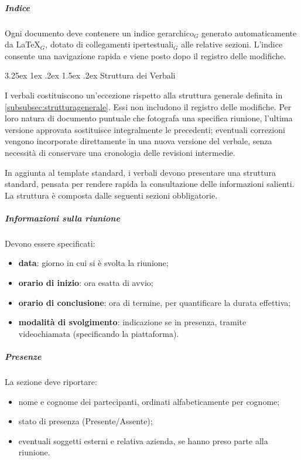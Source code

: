 \documentclass[a4paper, 10pt]{article}
\makeatletter
\renewcommand\paragraph{\@startsection{paragraph}{4}{\z@}%
  {3.25ex \@plus1ex \@minus .2ex}%
  {1.5ex \@plus .2ex}%
  {\normalfont\normalsize\bfseries}}
\makeatother
\begin{document}
\subparagraph{Indice}

Ogni documento deve contenere un indice gerarchico$_G$ generato automaticamente da \LaTeX$_G$, dotato di collegamenti ipertestuali$_G$ alle relative sezioni. L'indice consente una navigazione rapida e viene posto dopo il registro delle modifiche.

\paragraph{Struttura dei Verbali}
\label{par:strutturaverbali}

I verbali costituiscono un'eccezione rispetto alla struttura generale definita in \ref{subsubsec:strutturagenerale}. Essi non includono il registro delle modifiche. Per loro natura di documento puntuale che fotografa una specifica riunione, l'ultima versione approvata sostituisce integralmente le precedenti; eventuali correzioni vengono incorporate direttamente in una nuova versione del verbale, senza necessità di conservare una cronologia delle revisioni intermedie.

In aggiunta al template standard, i verbali devono presentare una struttura standard, pensata per rendere rapida la consultazione delle informazioni salienti. La struttura è composta dalle seguenti sezioni obbligatorie.

\subparagraph{Informazioni sulla riunione}

Devono essere specificati:
\begin{itemize}
    \item \textbf{data}: giorno in cui si è svolta la riunione;
    \item \textbf{orario di inizio}: ora esatta di avvio;
    \item \textbf{orario di conclusione}: ora di termine, per quantificare la durata effettiva;
    \item \textbf{modalità di svolgimento}: indicazione se in presenza, tramite videochiamata (specificando la piattaforma).
\end{itemize}

\subparagraph{Presenze}

La sezione deve riportare:
\begin{itemize}
    \item nome e cognome dei partecipanti, ordinati alfabeticamente per cognome;
    \item stato di presenza (Presente/Assente);
    \item eventuali soggetti esterni e relativa azienda, se hanno preso parte alla riunione.
\end{itemize}
\end{document}

